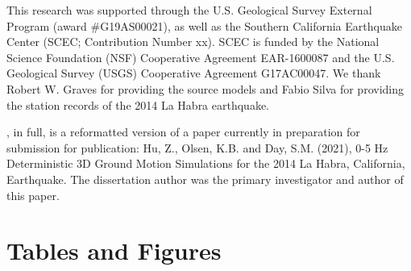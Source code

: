 This research was supported through the U.S. Geological Survey External Program (award \#G19AS00021), as well as the Southern California Earthquake Center (SCEC; Contribution Number xx). SCEC is funded by the National Science Foundation (NSF) Cooperative Agreement EAR-1600087 and the U.S. Geological Survey (USGS) Cooperative Agreement G17AC00047. We thank Robert W. Graves for providing the source models and Fabio Silva for providing the station records of the 2014 La Habra earthquake.

, in full, is a reformatted version of a paper currently in preparation for submission for publication: Hu, Z., Olsen, K.B. and Day, S.M. (2021), 0-5 Hz Deterministic 3D Ground Motion Simulations for the 2014 La Habra, California, Earthquake. The dissertation author was the primary investigator and author of this paper.


\newpage
\section*{Tables and Figures}
%


